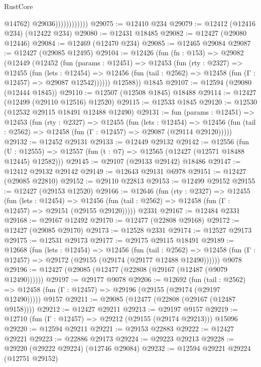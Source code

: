 \begin{lexlean}{RustCore}
\begin{coremodule}
                              @14762)
                            @29036))))))))))))
@29075 := @12410 @234
@29079 := @12412 (@12416 @234) (@12422 @234)
@29080 := @12431 @18485
@29082 := @12427 (@29080 @12446)
@29084 := @12469 (@12470 @234)
@29085 := @12465 @29084
@29087 := @12427 (@29085 @12495)
@29104 := @12426
    (fun (fn : @153) =>
    @29082
      (@12449
        (@12452
          (fun (params : @12451) =>
          @12453
            (fun (rty : @2327) =>
            @12455
              (fun (lets : @12454) =>
              @12456 (fun (tail : @2562) => @12458 (fun (Γ : @12457) => @29087 @12542))))))
        @12588))
    @1845
@29107 := @12594 (@29080 (@12444 @1845))
@29110 := @12507 (@12508 @1845) @18488
@29114 := @12427 (@12499 (@29110 @12516) @12520)
@29115 := @12533 @1845
@29120 := @12530 (@12532 @29115 @18491 @12488 @12490)
@29131 := fun (params : @12451) =>
  @12453
    (fun (rty : @2327) =>
    @12455
      (fun (lets : @12454) =>
      @12456 (fun (tail : @2562) => @12458 (fun (Γ : @12457) => @29087 (@29114 @29120)))))
@29132 := @12452 @29131
@29133 := @12449 @29132
@29142 := @12556
    (fun (U : @12555) => @12557 (fun (t : @7) => @12565 (@12427 (@12571 @18488 @12445) @12582)))
@29145 := @29107 (@29133 @29142) @18486
@29147 := @12412 @29132 @29142
@29149 := @12643 @29131 @6978
@29151 := @12427 (@29085 @22810)
@29152 := @29110 @22813
@29153 := @12499 @29152
@29155 := @12427 (@29153 @12520)
@29166 := @12646
    (fun (rty : @2327) =>
    @12455
      (fun (lets : @12454) =>
      @12456 (fun (tail : @2562) => @12458 (fun (Γ : @12457) => @29151 (@29155 @29120)))))
    @2331
@29167 := @12484 @2331
@29168 := @29167 @12492
@29170 := @12477 (@22808 @29168)
@29172 := @12427 (@29085 @29170)
@29173 := @12528 @2331
@29174 := @12527 @29173
@29175 := @12531 @29173
@29177 := @29175 @29115 @18491
@29189 := @12668
    (fun (lets : @12454) =>
    @12456
      (fun (tail : @2562) =>
      @12458 (fun (Γ : @12457) => @29172 (@29155 (@29174 (@29177 @12488 @12490))))))
    @9078
@29196 := @12427 (@29085 (@12477 (@22808 (@29167 (@12487 (@9079 @12490))))))
@29197 := @29177 @9078
@29206 := @12692
    (fun (tail : @2562) => @12458 (fun (Γ : @12457) => @29196 (@29155 (@29174 (@29197 @12490)))))
    @9157
@29211 := @29085 (@12477 (@22808 (@29167 (@12487 @9158))))
@29212 := @12427 @29211
@29213 := @29197 @9157
@29219 := @12710 (fun (Γ : @12457) => @29212 (@29155 (@29174 @29213))) @15096
@29220 := @12594 @29211
@29221 := @29153 @22883
@29222 := @12427 @29221
@29223 := @22886 @29173
@29224 := @29223 @29213
@29228 := @29220 (@29222 @29224) (@12746 @29084)
@29232 := @12594 @29221 @29224 (@12751 @29152)

\end{coremodule}
\end{lexlean}
